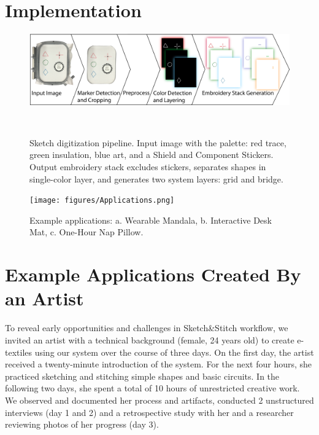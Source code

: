 \documentclass[header.tex]{subfiles}
\begin{document}
\section{Implementation}
 \begin{figure}[h!]
\centering
  \includegraphics[width=1.0\columnwidth]{figures/Pipeline}
  \caption{Sketch digitization pipeline. Input image with the palette: red trace, green insulation, blue art, and a Shield and Component Stickers. Output embroidery stack excludes stickers, separates shapes in single-color layer, and generates two system layers: grid and bridge.}~\label{fig:Pipeline}
  \vspace{-1.2em}
  \end{figure}

\begin{figure}[t!]
\centering
\texttt{[image: figures/Applications.png]}
\caption{Example applications: a. Wearable Mandala, b. Interactive Desk Mat, c. One-Hour Nap Pillow.}
 \vspace{-1.2em}
\label{fig:Applications}
\end{figure}






\section{Example Applications Created By an Artist} %
To reveal early opportunities and challenges in Sketch\&Stitch workflow, we invited an artist with a technical background (female, 24 years old) to create e-textiles using our system over the course of three days. On the first day, the artist received a twenty-minute introduction of the system. For the next four hours, she practiced sketching and stitching simple shapes and basic circuits. In the following two days, she spent a total of 10 hours of unrestricted creative work. We observed and documented her process and artifacts, conducted 2 unstructured interviews (day 1 and 2) and a retrospective study with her and a researcher reviewing photos of her progress (day 3).
\end{document}

